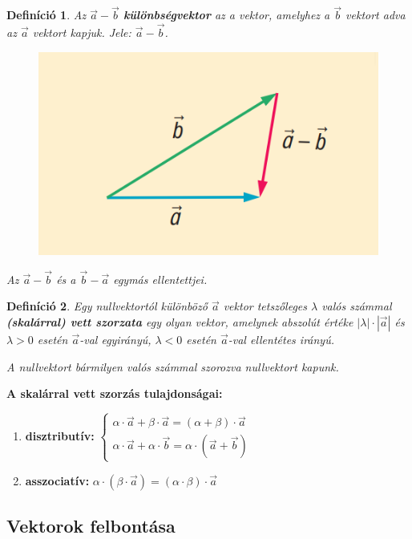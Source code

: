 \documentclass[12pt,a4paper]{article}
\newtheorem{definition}{Definíció} [section]
\begin{document}
\begin{definition}
Az $\vec{a} - \vec{b}$ \textbf{különbségvektor} az a vektor, amelyhez a $\vec{b}$ vektort adva az $\vec{a}$ vektort kapjuk. Jele: $\vec{a} - \vec{b}$.
\begin{figure}[h!]
\centering
\includegraphics[scale=0.3]{geometry/kulonbseg_vektor}
\end{figure}

Az $\vec{a} - \vec{b}$ és a $\vec{b} - \vec{a}$ egymás ellentettjei.
\end{definition}

\begin{definition}
Egy nullvektortól különböző $\vec{a}$ vektor tetszőleges $\lambda$ valós számmal \textbf{(skalárral) vett szorzata} egy olyan vektor, amelynek abszolút értéke $|\lambda|\cdot |\vec{a}|$ és $\lambda > 0$ esetén $\vec{a}$-val egyirányú, $\lambda < 0$ esetén $\vec{a}$-val ellentétes irányú.

A nullvektort bármilyen valós számmal szorozva nullvektort kapunk.
\end{definition}

\textbf{A skalárral vett szorzás tulajdonságai:}
\begin{enumerate}
\item \textbf{disztributív:} $\begin{cases} \alpha \cdot \vec{a} + \beta \cdot \vec{a} = (\alpha+\beta)\cdot \vec{a} \\ \alpha \cdot \vec{a} + \alpha \cdot \vec{b} = \alpha\cdot (\vec{a}+\vec{b}) \end{cases}$
\item \textbf{asszociatív:} $\alpha \cdot (\beta \cdot \vec{a}) = (\alpha \cdot \beta) \cdot \vec{a}$
\end{enumerate}

\subsection{Vektorok felbontása}
\end{document}
